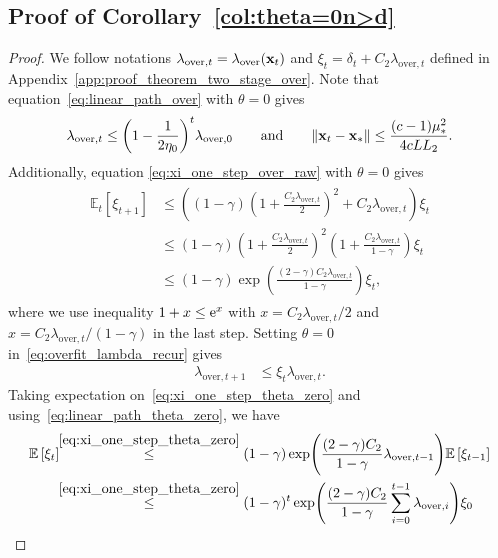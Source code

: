\documentclass[11pt]{article}
\theoremstyle{plain}
\theoremstyle{definition}
\theoremstyle{remark}
\theoremstyle{plain}
\def\x{{\bf x}}
\def\EB{{\mathbb E}}
\def \EBP #1{\EB\left[#1\right]}
\begin{document}
\subsection{Proof of Corollary~\ref{col:theta=0n>d}}
\label{app:proof_coro_n>d}
\begin{proof}
We follow notations 
$\lambda_{\mathrm{over},t}=\lambda_{\mathrm{over}}(\x_t)$ and
$\xi_t=\delta_t+C_2\lambda_{\mathrm{over},t}$ defined in Appendix~\ref{app:proof_theorem_two_stage_over}.
Note that equation~\eqref{eq:linear_path_over} with $\theta=0$ gives
\begin{align}
\label{eq:linear_path_theta_zero}
\lambda_{\mathrm{over},t}
\leq\biggl(1-\frac{1}{2\eta_0}\biggr)^t
\lambda_{\mathrm{over},0}
\qquad\text{and}\qquad
\|\x_t-\x_*\|\leq\frac{(c-1)\mu_*^2}{4cLL_2}.
\end{align}
Additionally, equation \eqref{eq:xi_one_step_over_raw} with $\theta=0$  gives
\begin{align}
\label{eq:xi_one_step_theta_zero}
\begin{split}    
\mathbb E_t[\xi_{t+1}]
&\leq\left((1-\gamma)
\left(1+\frac{C_2\lambda_{\mathrm{over},t}}{2}\right)^2
+C_2\lambda_{\mathrm{over},t}\right)\xi_t \\
&\leq (1-\gamma)\left(1+\frac{C_2\lambda_{\mathrm{over},t}}{2}\right)^2\left(1+\frac{C_2\lambda_{\mathrm{over},t}}{1-\gamma}\right)\xi_t\\
&\leq(1-\gamma)
\exp\left(\frac{(2-\gamma)C_2\lambda_{\mathrm{over},t}}{1-\gamma}
\right)\xi_t,
\end{split}
\end{align}
where we use inequality $1+x\leq {\rm e}^x$ with $x=C_2\lambda_{\mathrm{over},t}/2$ and $x=C_2\lambda_{\mathrm{over},t}/(1-\gamma)$ in the last step.
Setting $\theta=0$ in~\eqref{eq:overfit_lambda_recur} gives
\begin{align}
\label{eq:lambda_one_step_theta_zero}
\lambda_{\mathrm{over},t+1}
&\leq\xi_t\lambda_{\mathrm{over},t}.
\end{align}
Taking expectation on~\eqref{eq:xi_one_step_theta_zero} and using~\eqref{eq:linear_path_theta_zero}, we have
\begin{align}\label{eq:xi_decay_theta_zero}
\begin{split}    
\EBP{\xi_t}
&\!\!\overset{\eqref{eq:xi_one_step_theta_zero}}{\leq} (1-\gamma)\exp\Biggl(\frac{(2-\gamma)C_2}{1-\gamma}\lambda_{\mathrm{over},t-1}\Biggr)\EBP{\xi_{t-1}}\\
&\!\!\overset{\eqref{eq:xi_one_step_theta_zero}}{\leq} (1-\gamma)^t \exp\Biggl(\frac{(2-\gamma)C_2}{1-\gamma}\sum_{i=0}^{t-1}\lambda_{\mathrm{over},i}\Biggr)\xi_0\\

\end{split}
\end{align}
\end{proof}
\end{document}
